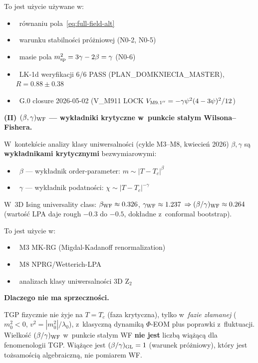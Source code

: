 To jest u\.zycie u\.zywane w:
\begin{itemize}\itemsep0pt
  \item~r\'ownaniu pola~\eqref{eq:full-field-alt}
  \item~warunku stabilno\'sci pr\'o\.zniowej (N0-2, N0-5)
  \item~masie pola $m_{\rm sp}^2 = 3\gamma - 2\beta = \gamma$ (N0-6)
  \item~LK-1d weryfikacji 6/6 PASS (PLAN\_DOMKNIECIA\_MASTER), $R = 0.88 \pm 0.38$
  \item~G.0 closure 2026-05-02 (V\_M911 LOCK $V_{\rm M9.1''} = -\gamma\psi^2(4-3\psi)^2/12$)
\end{itemize}

\medskip\noindent
\textbf{(II) $(\beta, \gamma)_{\rm WF}$ --- wyk\l{}adniki krytyczne w~punkcie
sta\l{}ym Wilsona--Fishera.}

W~kontek\'scie analizy klasy uniwersalno\'sci (cykle M3--M8, kwiecie\'n 2026)
$\beta, \gamma$ s\k{a} \textbf{wyk\l{}adnikami krytycznymi} bezwymiarowymi:
\begin{itemize}\itemsep0pt
  \item~$\beta$ --- wyk\l{}adnik order-parameter: $m \sim |T-T_c|^\beta$
  \item~$\gamma$ --- wyk\l{}adnik podatno\'sci: $\chi \sim |T-T_c|^{-\gamma}$
\end{itemize}
W~3D Ising universality class:
$\beta_{\rm WF} \approx 0.326$, $\gamma_{\rm WF} \approx 1.237$
$\Rightarrow (\beta/\gamma)_{\rm WF} \approx 0.264$ (warto\'s\'c LPA daje
rough $-0.3$ do $-0.5$, dok\l{}adne z~conformal bootstrap).

To jest u\.zycie w:
\begin{itemize}\itemsep0pt
  \item~M3 MK-RG (Migdal-Kadanoff renormalization)
  \item~M8 NPRG/Wetterich-LPA
  \item~analizach klasy uniwersalno\'sci 3D Z$_2$
\end{itemize}

\medskip\noindent
\textbf{Dlaczego nie ma sprzeczno\'sci.}

TGP fizycznie nie \.zyje na $T = T_c$ (faza krytyczna), tylko w~\emph{fazie
z\l{}amanej} ($m_0^2 < 0$, $v^2 = |m_0^2|/\lambda_0$), z~klasyczn\k{a}
dynamik\k{a} $\Phi$-EOM plus poprawki z~fluktuacji. Wielko\'s\'c
$(\beta/\gamma)_{\rm WF}$ w~punkcie sta\l{}ym WF \textbf{nie jest} liczb\k{a}
wi\k{a}\.z\k{a}c\k{a} dla fenomenologii TGP. Wi\k{a}\.z\k{a}ce jest
$(\beta/\gamma)_{\rm GL} = 1$ (warunek pr\'o\.zniowy), kt\'ory jest
to\.zsamo\'sci\k{a} algebraiczn\k{a}, nie pomiarem WF.

